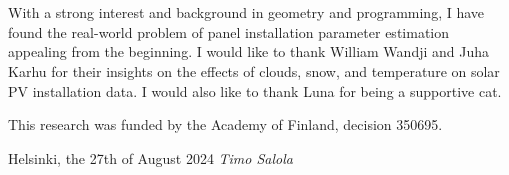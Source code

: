 \hypertarget{prefacepage}{}
%
\section*{\prefacename}
With a strong interest and background in geometry and programming, I have found the real-world problem of panel installation parameter estimation appealing from the beginning. I would like to thank William Wandji and Juha Karhu for their insights on the effects of clouds, snow, and temperature on solar PV installation data. I would also like to thank Luna for being a supportive cat.


\vspace{3mm}
\noindent This research was funded by the Academy of Finland, decision 350695.


\vspace{9mm}
\noindent
Helsinki, the 27th of August 2024 %
%
%
\vspace{11mm}
\hspace{1.6cm}\emph{Timo Salola}

\vfill















